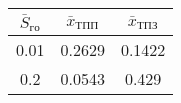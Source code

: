 \begin{tabular}{|c|c|c|}
\hline
$\bar{S}_{го}$ & $\bar{x}_{ТПП}$ & $\bar{x}_{ТПЗ}$ \\ 
\hline
0.01 & 0.2629 & 0.1422 \\ 
\hline
0.2 & 0.0543 & 0.429 \\ 
\hline
\end{tabular}